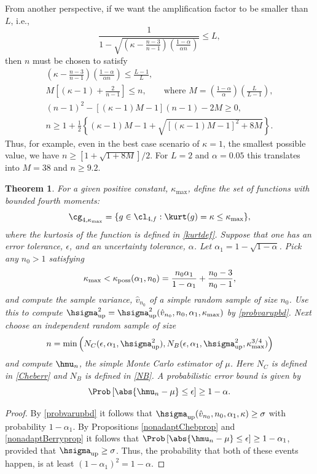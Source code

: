 \documentclass[12pt]{amsart}
\newcommand{\hv}{\hat{v}}
\newtheorem{theorem}{Theorem}
\begin{document}
From another perspective, if we want the amplification factor to be smaller than $L$, i.e., 
\[
\frac{1}{1 - \sqrt{ \left ( \kappa  - \frac{n-3}{n-1}\right)\left(\frac{1-\alpha}{\alpha n }\right)}} \le L,
\]
then $n$ must be chosen to satisfy
\begin{gather*}
\left(\kappa  - \frac{n-3}{n-1}\right)\left(\frac{1-\alpha}{\alpha n }\right) \le \frac{L-1}{L}, \\
M\left[(\kappa-1)  + \frac{2}{n-1}\right] \le n, \qquad \text{where } M= \left(\frac{1-\alpha}{\alpha}\right)  \left(\frac{L}{L-1} \right), \\
(n-1)^2 - [(\kappa-1)M -1](n-1)  - 2 M \ge 0, \\
n \ge 1 + \frac{1}{2} \left\{ (\kappa-1)M -1 + \sqrt{\left[(\kappa-1)M -1\right]^2 + 8 M}\right\}.
\end{gather*}
Thus, for example, even in the best case scenario of $\kappa=1$, the smallest possible value, we have $n \ge [1 + \sqrt{1 + 8 M}]/2$.  For $L=2$ and $\alpha=0.05$ this translates into $M=38$ and $n \ge 9.2$.

\begin{theorem} \label{mainadaptthm} For a given positive constant, $\kappa_{\max}$, define the set of functions with bounded fourth moments:
\[
\cg_{4,\kappa_{\max}}= \{g \in \cl_{4,f} : \kurt(g)= \kappa \le \kappa_{\max} \},
\]
where the kurtosis of the function is defined in \eqref{kurtdef}.
Suppose that one has an error tolerance, $\epsilon$, and an uncertainty tolerance, $\alpha$. Let $\alpha_1 = 1 - \sqrt{1 - \alpha}$.  Pick any $n_0>1$ satisfying
\[
\kappa_{\max} < \kappa_{\text{\rm poss}}(\alpha_1,n_0)  = \frac{n_0 \alpha_1}{1-\alpha_1} + \frac{n_0-3}{n_0-1},
\]
and compute the sample variance, $\hv_{n_0}$ of a simple random sample of size $n_0$.   Use this to compute $\hsigma^2_{\text{\rm up}} = \hsigma^2_{\text{\rm up}}(\hv_{n_0},n_0,\alpha_1,\kappa_{\max})$ by \eqref{probvarupbd}.  Next choose an independent random sample of size 
\[
n = \min\left( N_C(\epsilon,\alpha_1,\hsigma^2_{\text{\rm up}}), N_B(\epsilon,\alpha_1,\hsigma^2_{\text{\rm up}},\kappa_{\max}^{3/4}) \right)
\]
and compute $\hmu_n$, the simple Monte Carlo estimator of $\mu$.  Here $N_C$ is defined in \eqref{Cheberr} and  $N_B$ is defined in \eqref{NB}.  A probabilistic error bound is given by
\[
\Prob\left[\abs{\hmu_n-\mu} \le \epsilon \right] \geq 1-\alpha.
\]
\end{theorem}
\begin{proof}
By \eqref{probvarupbd} it follows that $\hsigma_{\text{up}}(\hv_{n_0},n_0,\alpha_1,\kappa)  \ge \sigma$ with probability $1-\alpha_1$.  By Propositions  \ref{nonadaptChebprop} and \ref{nonadaptBerryprop} it follows that  $\Prob\left[\abs{\hmu_n-\mu} \le \epsilon \right] \geq 1-\alpha_1$, provided that $\hsigma_{\text{up}}  \ge \sigma$.  Thus, the probability that both of these events happen, is at least $(1-\alpha_1)^2=1-\alpha$.
\end{proof}
\end{document}
